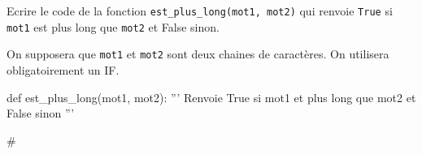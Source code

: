 \documentclass[a4paper,10pt]{report}
\def\ptsexoC{2}
\begin{document}
\bigskip

\exods{\ptsexoC}

Ecrire le code de la fonction \verb|est_plus_long(mot1, mot2)| qui renvoie \verb|True| si \verb|mot1| est plus long que \verb|mot2| et False sinon.

On supposera que \verb|mot1| et \verb|mot2| sont deux chaines de caractères. On utilisera obligatoirement un IF.

\begin{CodePythontexAlt}[TaillePolice=\large,Largeur=1\linewidth,Centre,PremLigne=1]{}
def est_plus_long(mot1, mot2):
    ''' Renvoie True si mot1 et plus long que mot2 et False sinon '''






    #
\end{CodePythontexAlt}


\bigskip
\end{document}
